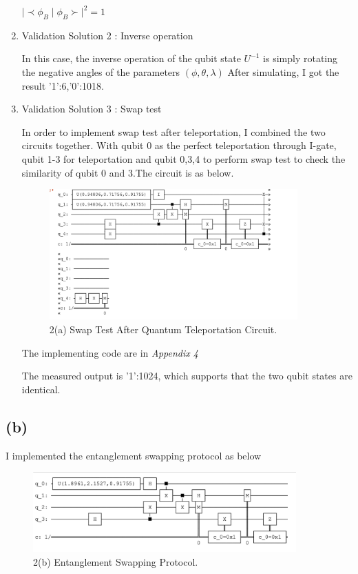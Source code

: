 \documentclass{article}
\begin{document}
\begin{CJK*}{UTF8}{bsmi}
\begin{enumerate}
    $\lvert \prec \phi_B \mid \phi_B \succ \rvert^2 = 1$

    \item Validation Solution 2 : Inverse operation 
    
    In this case, the inverse operation of the qubit state $U^{-1}$ is simply rotating the negative angles of the parameters $(\phi, \theta, \lambda)$
    After simulating, I got the result {'1':6,'0':1018}.
    
    \item Validation Solution 3 : Swap test
    
    In order to implement swap test after teleportation, I combined the two circuits together. With qubit 0 as the perfect teleportation through I-gate, qubit 1-3 for teleportation and qubit 0,3,4 to perform swap test to check the similarity of qubit 0 and 3.The circuit is as below.
    \begin{figure}[h]
    \centering
    \includegraphics[width=0.9\textwidth]{2asol3.png}
    \caption{\label{fig:2asol3}2(a) Swap Test After Quantum Teleportation Circuit.}
    \end{figure}
    
    The implementing code are in \emph {Appendix 4}
    
    The measured output is {'1':1024}, which supports that the two qubit states are identical.
    
\end{enumerate}

\subsection{(b)}
 I implemented the entanglement swapping protocol as below
    \begin{figure}[h]
    \centering
    \includegraphics[width=0.9\textwidth]{2bcir.png}
    \caption{\label{fig:2bcir}2(b) Entanglement Swapping Protocol.}
    \end{figure}


\end{CJK*}
\end{document}
